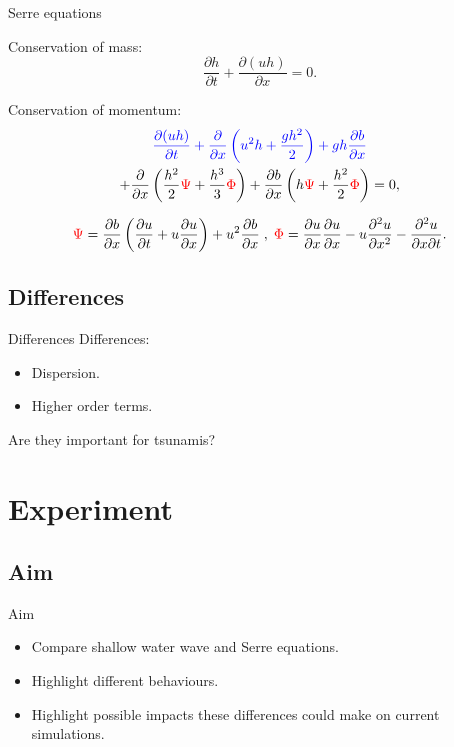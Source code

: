 \documentclass[pdf]{beamer}
\begin{document}
\begin{frame}{Serre equations}
	
	    Conservation of mass:
	    \[
		\dfrac{\partial h}{\partial t} + \dfrac{\partial (uh)}{\partial x} = 0.
		\]

		Conservation of momentum:
		\begin{multline*}
				{\color{blue} \dfrac{\partial (uh)}{\partial t} + \dfrac{\partial}{\partial x} \left ( u^2h + \dfrac{gh^2}{2}\right ) + gh \frac{\partial b}{\partial x}}  \\+ \dfrac{\partial}{\partial x} \left ( \dfrac{h^2}{2}{\color{red} \Psi} + \dfrac{h^3}{3}{\color{red} \Phi }   \right ) + \dfrac{\partial b}{\partial x} \left (  h{\color{red} \Psi} + \dfrac{h^2}{2}{\color{red} \Phi }  \right ) = 0,
		\end{multline*}
		
		\[ {\color{red} \Psi }  = \dfrac{\partial b}{\partial x}\left(\dfrac{\partial u}{\partial t} + u\dfrac{\partial u}{\partial x} \right)  + u^2\dfrac{\partial b}{\partial x} \;, \; 
		{\color{red} \Phi }  = \dfrac{\partial u }{\partial x} \dfrac{\partial u}{\partial x} -u \dfrac{\partial^2 u}{\partial x^2}  - \dfrac{\partial^2 u}{\partial x \partial t}  .\]
\end{frame}

\subsection{Differences}
\begin{frame}{Differences}
	Differences:
	\begin{itemize}
		\item Dispersion.
		\item Higher order terms.
	\end{itemize}
	Are they important for tsunamis?
\end{frame}


\section{Experiment}
\subsection{Aim}
\begin{frame}{Aim}
	\begin{itemize}
		\item Compare shallow water wave and Serre equations.
		\item Highlight different behaviours.
		\item Highlight possible impacts these differences could make on current simulations.
	\end{itemize}
\end{frame}
\end{document}
